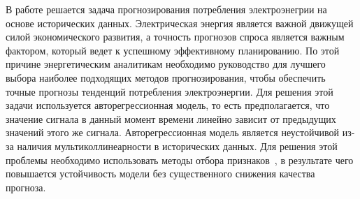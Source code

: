 \documentclass[12pt,fleqn,unicode]{article}
\begin{document}
В работе решается задача прогнозирования потребления электроэнегрии на основе исторических данных. Электрическая энергия является важной движущей силой экономического развития, а точность прогнозов спроса является важным фактором, который ведет к успешному эффективному планированию. По этой причине энергетическим аналитикам необходимо руководство для лучшего выбора наиболее подходящих методов прогнозирования, чтобы обеспечить точные прогнозы тенденций потребления электроэнергии. Для решения этой задачи используется авторегрессионная модель, то есть предполагается, что значение сигнала в данный момент времени линейно зависит от предыдущих значений этого же сигнала. Авторегрессионная модель является неустойчивой из-за наличия мультиколлинеарности в исторических данных. Для решения этой проблемы необходимо использовать методы отбора признаков~\cite{Adolph}, в результате чего повышается устойчивость модели без существенного снижения качества прогноза.
\end{document}
